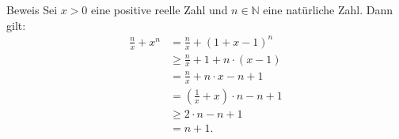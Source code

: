 \documentclass[10pt]{beamer}
\def\bN{\mathbb{N}}
\begin{document}
\begin{frame}{Beweis}
    Sei \( x > 0 \) eine positive reelle Zahl und \( n \in \bN \) eine natürliche Zahl. Dann gilt:
    \begin{align*}
        \frac{n}{x} + x^{n}
        & = \frac{n}{x} + \left(1 + x - 1 \right)^{n} \\
        & \geq \frac{n}{x} + 1 + n \cdot \left(x - 1 \right) \\
        & = \frac{n}{x} + n \cdot x - n + 1 \\
        & = \left( \frac{1}{x} + x \right) \cdot n - n + 1 \\
        & \geq 2 \cdot n - n + 1 \\
        & = n + 1.
    \end{align*}
\end{frame}
\end{document}

